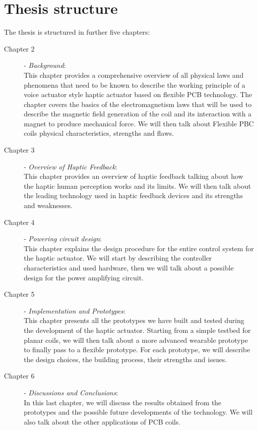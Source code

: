 \section{Thesis structure}
The thesis is structured in further five chapters:
\begin{description}
    \item[Chapter 2] - \textit{Background}:\\ This chapter provides a comprehensive overview of all physical laws and phenomena that need to be known to describe the working principle of a voice actuator style haptic actuator based on flexible PCB technology. The chapter covers the basics of the electromagnetism laws that will be used to describe the magnetic field generation of the coil and its interaction with a magnet to produce mechanical force.
    We will then talk about Flexible PBC coils physical characteristics, strengths and flaws.

    \item[Chapter 3] - \textit{Overview of Haptic Feedback}:\\ This chapter provides an overview of haptic feedback talking about how the haptic human perception works and its limits. We will then talk about the leading technology used in haptic feedback devices and its strengths and weaknesses.

    \item[Chapter 4] - \textit{Powering circuit design}: \\
    This chapter explains the design procedure for the entire control system for the haptic actuator. We will start by describing the controller characteristics and used hardware, then we will talk about a possible design for the power amplifying circuit.

    \item[Chapter 5] - \textit{Implementation and Prototypes}:\\
    This chapter presents all the prototypes we have built and tested during the development of the haptic actuator. Starting from a simple testbed for planar coils, we will then talk about a more advanced wearable prototype to finally pass to a flexible prototype. For each prototype, we will describe the design choices, the building process, their strengths and issues.


    \item[Chapter 6] - \textit{Discussions and Conclusions}:\\
    In this last chapter, we will discuss the results obtained from the prototypes and the possible future developments of the technology. We will also talk about the other applications of PCB coils.
\end{description}